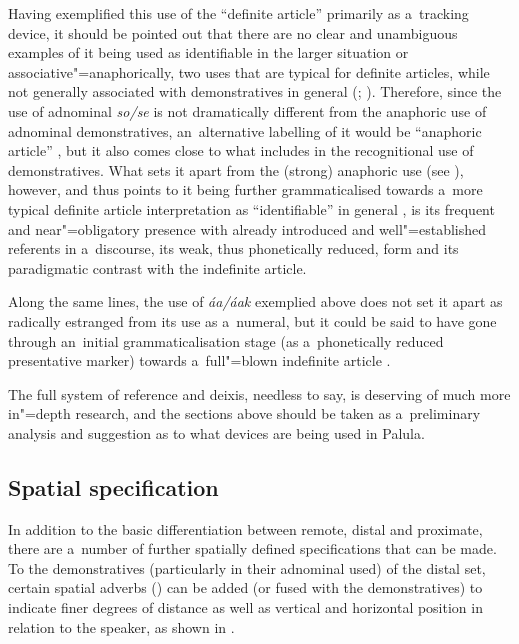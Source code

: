 Having exemplified this use of the ``definite article'' primarily as a~tracking device, it should be pointed out that there are no clear and unambiguous examples of it being used as identifiable in the larger situation or associative"=anaphorically, two uses that are typical for definite articles, while not generally associated with demonstratives in general (\citealt[485]{juvonen2006}; \citealt[233]{himmelmann1996}). Therefore, since the use of adnominal \textit{so/se} is not dramatically different from the anaphoric use of adnominal demonstratives, an~alternative labelling of it would be ``anaphoric article'' \citep[486]{juvonen2006}, but it also comes close to what \citet[230--239]{himmelmann1996} includes in the recognitional use of demonstratives. What sets it apart from the (strong) anaphoric use (see ), however, and thus points to it being further grammaticalised towards a~more typical definite article interpretation as ``identifiable'' in general \citep[485]{juvonen2006}, is its frequent and near"=obligatory presence with already introduced and well"=established referents in a~discourse, its weak, thus phonetically reduced, form and its paradigmatic contrast with the indefinite article.


Along the same lines, the use of \textit{áa/áak} exemplied above does not set it apart as radically estranged from its use as a~numeral, but it could be said to have gone through an~initial grammaticalisation stage (as a~phonetically reduced presentative marker) towards a~full"=blown indefinite article \citep[486]{juvonen2006}.



The full system of reference and deixis, needless to say, is deserving of much more in"=depth research, and the sections above should be taken as a~preliminary analysis and suggestion as to what devices are being used in Palula.


\subsection{Spatial specification}
\label{subsec:5-2-7}

In addition to the basic differentiation between remote, distal and proximate, there are a~number of further spatially defined specifications that can be made. To the demonstratives (particularly in their adnominal used) of the distal set, certain spatial adverbs () can be added (or fused with the demonstratives) to indicate finer degrees of distance as well as vertical and horizontal position in relation to the speaker, as shown in .


